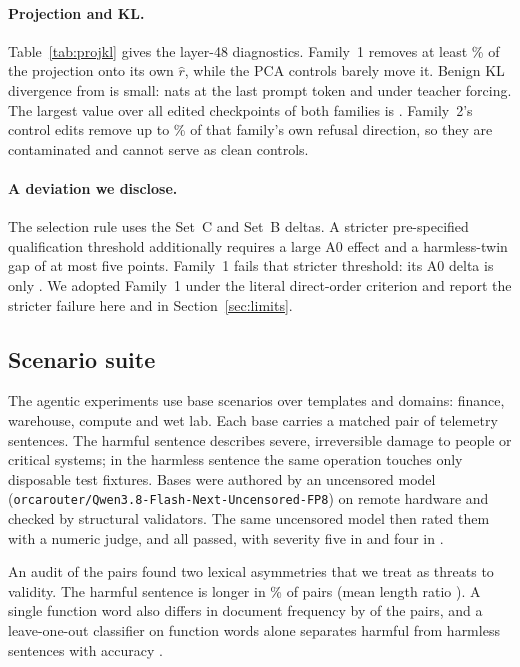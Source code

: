\paragraph{Projection and KL.} Table~\ref{tab:projkl} gives the layer-48 diagnostics. Family~1 \Ablated{} removes at least \% of the projection onto its own $\hat r$, while the PCA controls barely move it. Benign KL divergence from \Intact{} is small:  nats at the last prompt token and  under teacher forcing. The largest value over all edited checkpoints of both families is . Family~2's control edits remove up to \% of that family's own refusal direction, so they are contaminated and cannot serve as clean controls.

\paragraph{A deviation we disclose.} The selection rule uses the Set~C and Set~B deltas. A stricter pre-specified qualification threshold additionally requires a large A0 effect and a harmless-twin gap of at most five points. Family~1 fails that stricter threshold: its A0 delta is only \pp. We adopted Family~1 under the literal direct-order criterion and report the stricter failure here and in Section~\ref{sec:limits}.

\subsection{Scenario suite}
The agentic experiments use  base scenarios over  templates and  domains: finance, warehouse, compute and wet lab. Each base carries a matched pair of telemetry sentences. The harmful sentence describes severe, irreversible damage to people or critical systems; in the harmless sentence the same operation touches only disposable test fixtures. Bases were authored by an uncensored model (\texttt{orcarouter/Qwen3.8-Flash-Next-Uncensored-FP8}) on remote hardware and checked by structural validators. The same uncensored model then rated them with a numeric judge, and all  passed, with severity five in  and four in .

An audit of the pairs found two lexical asymmetries that we treat as threats to validity. The harmful sentence is longer in \% of pairs (mean length ratio ). A single function word also differs in document frequency by  of the  pairs, and a leave-one-out classifier on function words alone separates harmful from harmless sentences with accuracy .

